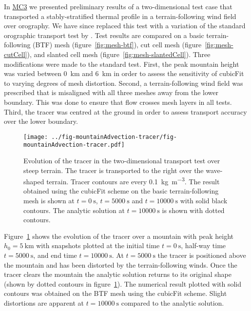 \documentclass[a4paper,11pt]{article}
\begin{document}
In \href{http://www.datumedge.co.uk/publications/mc-report-2016-05.pdf}{MC3} we presented preliminary results of a two-dimensional test case that transported a stably-stratified thermal profile in a terrain-following wind field over orography.  We have since replaced this test with a variation of the standard orographic transport test by \citet{schaer2002}.
Test results are compared on a basic terrain-following (BTF) mesh (figure~\ref{fig:mesh-btf}), cut cell mesh (figure~\ref{fig:mesh-cutCell}), and slanted cell mesh (figure~\ref{fig:mesh-slantedCell}).  Three modifications were made to the standard test.
First, the peak mountain height was varied between \SI{0}{\kilo\meter} and \SI{6}{\kilo\meter} in order to assess the sensitivity of cubicFit to varying degrees of mesh distortion.
Second, a terrain-following wind field was prescribed that is misaligned with all three meshes away from the lower boundary.  This was done to ensure that flow crosses mesh layers in all tests.
Third, the tracer was centred at the ground in order to assess transport accuracy over the lower boundary.

\begin{figure}
	\centering
	\texttt{[image: ../fig-mountainAdvection-tracer/fig-mountainAdvection-tracer.pdf]}
	\caption{Evolution of the tracer in the two-dimensional transport test over steep terrain.  The tracer is transported to the right over the wave-shaped terrain.  Tracer contours are every \SI{0.1}{\kilo\gram\per\meter\cubed}.  The result obtained using the cubicFit scheme on the basic terrain-following mesh is shown at $t=\SI{0}{\second}$, $t=\SI{5000}{\second}$ and $t=\SI{10000}{\second}$ with solid black contours. The analytic solution at $t=\SI{10000}{\second}$ is shown with dotted contours.}
	\label{fig:mountainAdvection-tracer}
\end{figure}

Figure~\ref{fig:mountainAdvection-tracer} shows the evolution of the tracer over a mountain with peak height $h_0 = \SI{5}{\kilo\meter}$ with snapshots plotted at the initial time $t = \SI{0}{\second}$, half-way time $t = \SI{5000}{\second}$, and end time $t= \SI{10000}{\second}$.  At $t = \SI{5000}{\second}$ the tracer is positioned above the mountain and has been distorted by the terrain-following winds.  Once the tracer clears the mountain the analytic solution returns to its original shape (shown by dotted contours in figure~\ref{fig:mountainAdvection-tracer}).  The numerical result plotted with solid contours was obtained on the BTF mesh using the cubicFit scheme.  Slight distortions are apparent at $t = \SI{10000}{\second}$ compared to the analytic solution.
\end{document}
